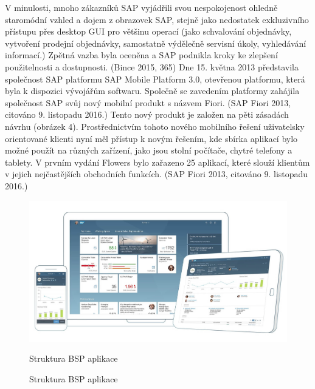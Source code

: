 \documentclass[thesis=M,czech]{FITthesis}[2012/06/26]
\begin{document}
V minulosti, mnoho zákazníků SAP vyjádřili svou nespokojenost ohledně staromódní vzhled a dojem z obrazovek SAP, stejně jako nedostatek exkluzivního přístupu přes desktop GUI pro většinu operací (jako schvalování objednávky, vytvoření prodejní objednávky, samostatně výdělečně servisní úkoly, vyhledávání informací.) Zpětná vazba byla oceněna a SAP podnikla kroky ke zlepšení použitelnosti a dostupnosti. (Bince 2015, 365)
Dne 15. května 2013 představila společnost SAP platformu SAP Mobile Platform 3.0, otevřenou platformu, která byla k dispozici vývojářům softwaru. Společně se zavedením platformy zahájila společnost SAP svůj nový mobilní produkt s názvem Fiori. (SAP Fiori 2013, citováno 9. listopadu 2016.) Tento nový produkt je založen na pěti zásadách návrhu (obrázek 4).
Prostřednictvím tohoto nového mobilního řešení uživatelsky orientované klienti nyní měl přístup k novým řešením, kde sbírka aplikací bylo možné použít na různých zařízení, jako jsou stolní počítače, chytré telefony a tablety. V prvním vydání Flowers bylo zařazeno 25 aplikací, které slouží klientům v jejich nejčastějších obchodních funkcích. (SAP Fiori 2013, citováno 9. listopadu 2016.)


\begin{figure}[H]
	\centering
	\includegraphics[width=1\textwidth]{images/fiori.jpg}
	\caption{Struktura BSP aplikace}
	\label{img:fiori}
	\small
	Struktura BSP aplikace
\end{figure}
\end{document}
